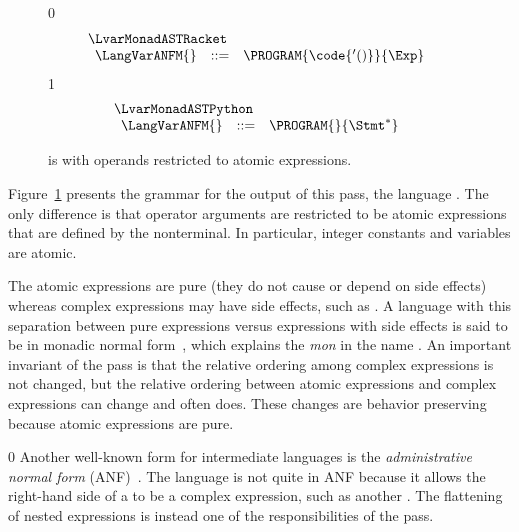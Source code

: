 \documentclass[7x10]{TimesAPriori_MIT}%
\def\racketEd{0}
\def\pythonEd{1}
\providecommand{\BookEdition}{1}
\let\edition\BookEdition
\newcommand{\pythonColor}[0]{}
\numberwithin{theorem}{chapter}
\numberwithin{definition}{chapter}
\numberwithin{equation}{chapter}
\begin{document}
\begin{figure}[tp]
\centering
\begin{tcolorbox}[colback=white]
{\if\edition\racketEd
\[
\begin{array}{l}
  \LvarMonadASTRacket \\
\begin{array}{rcl}
\LangVarANFM{}  &::=& \PROGRAM{\code{'()}}{\Exp}
\end{array}
\end{array}
\]
\fi}
{\if\edition\pythonEd\pythonColor
\[
\begin{array}{l}
  \LvarMonadASTPython \\
\begin{array}{rcl}
\LangVarANFM{}  &::=& \PROGRAM{}{\Stmt^{*}}
\end{array}
\end{array}
\]
\fi}  
\end{tcolorbox}

\caption{\LangVarANF{} is \LangVar{} with operands restricted to
  atomic expressions.}
\label{fig:Lvar-anf-syntax}
\end{figure}

Figure~\ref{fig:Lvar-anf-syntax} presents the grammar for the output
of this pass, the language \LangVarANF{}. The only difference is that
operator arguments are restricted to be atomic expressions that are
defined by the \Atm{} nonterminal. In particular, integer constants
and variables are atomic.

The atomic expressions are pure (they do not cause or depend on side
effects) whereas complex expressions may have side effects, such as
\READ{}.  A language with this separation between pure expressions
versus expressions with side effects is said to be in monadic normal
form~\citep{Moggi:1991in,Danvy:2003fk}, which explains the \textit{mon}
in the name \LangVarANF{}. An important invariant of the
 pass is that the relative ordering
among complex expressions is not changed, but the relative ordering
between atomic expressions and complex expressions can change and
often does. These changes are behavior preserving because
atomic expressions are pure.

{\if\edition\racketEd
  Another well-known form for intermediate languages is the
\emph{administrative normal form}
(ANF)~\citep{Danvy:1991fk,Flanagan:1993cg}.
 
%
The \LangVarANF{} language is not quite in ANF because it allows the
right-hand side of a  to be a complex expression, such as
another . The flattening of nested  expressions is
instead one of the responsibilities of the 
pass.
\fi}
\end{document}
